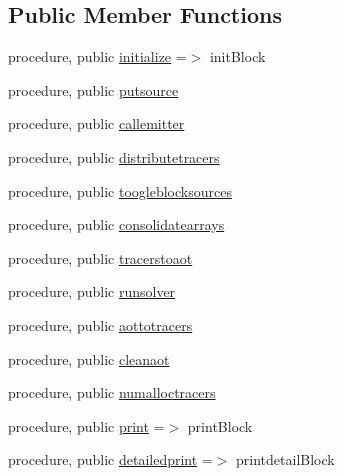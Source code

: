 \subsection*{Public Member Functions}
\begin{DoxyCompactItemize}
\item 
procedure, public \mbox{\hyperlink{structblocks__mod_1_1block__class_ad671745ca5dc3227ddb0ed1d9ff45268}{initialize}} =$>$ init\+Block
\item 
procedure, public \mbox{\hyperlink{structblocks__mod_1_1block__class_ac79980e841902691a06212dce50f6331}{putsource}}
\item 
procedure, public \mbox{\hyperlink{structblocks__mod_1_1block__class_ad1d0f1aca1323fad86177deb0b818a51}{callemitter}}
\item 
procedure, public \mbox{\hyperlink{structblocks__mod_1_1block__class_a00f8c114e84499356db3f8b633a6b3a3}{distributetracers}}
\item 
procedure, public \mbox{\hyperlink{structblocks__mod_1_1block__class_a73bd9f99f97d7fd882a3ade1103d27ae}{toogleblocksources}}
\item 
procedure, public \mbox{\hyperlink{structblocks__mod_1_1block__class_a68f5bb0cb32b5b51cffd66d472cc45f0}{consolidatearrays}}
\item 
procedure, public \mbox{\hyperlink{structblocks__mod_1_1block__class_ad3521ef8424f47673a2acd15b5bd0545}{tracerstoaot}}
\item 
procedure, public \mbox{\hyperlink{structblocks__mod_1_1block__class_abe738c65f3fecf013c3884275a3fe7e4}{runsolver}}
\item 
procedure, public \mbox{\hyperlink{structblocks__mod_1_1block__class_af7ee4536d72f1a114d9289c9e484f703}{aottotracers}}
\item 
procedure, public \mbox{\hyperlink{structblocks__mod_1_1block__class_ab58da434b2813d158b3f688d3c60d02c}{cleanaot}}
\item 
procedure, public \mbox{\hyperlink{structblocks__mod_1_1block__class_a7a3f2eb6823a683a6aaa2159b50ee990}{numalloctracers}}
\item 
procedure, public \mbox{\hyperlink{structblocks__mod_1_1block__class_a43b4c133934eaadb55d30cf834d1e28c}{print}} =$>$ print\+Block
\item 
procedure, public \mbox{\hyperlink{structblocks__mod_1_1block__class_a937d8dca8393460bc718dafa8a5c03ac}{detailedprint}} =$>$ printdetail\+Block
\end{DoxyCompactItemize}
